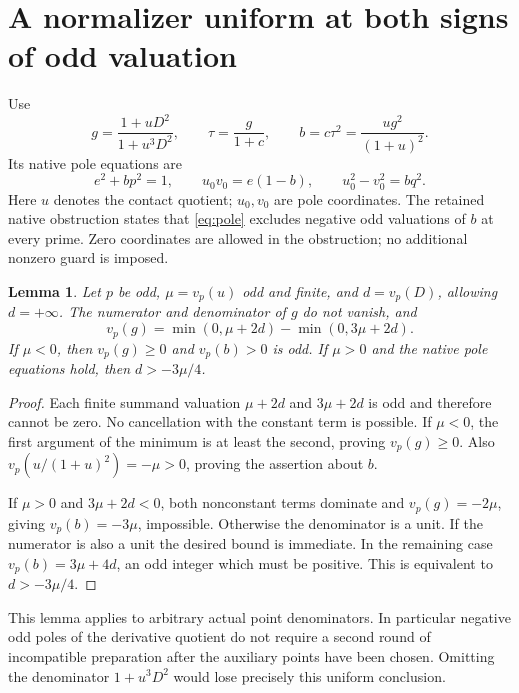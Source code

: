 \documentclass[11pt,a4paper]{article}
\newtheorem{lemma}[theorem]{Lemma}
\begin{document}
\section{A normalizer uniform at both signs of odd valuation}

Use
\begin{equation}\label{eq:normalizer}
 g=\frac{1+uD^2}{1+u^3D^2},\qquad
 \tau=\frac{g}{1+c},\qquad
 b=c\tau^2=\frac{u g^2}{(1+u)^2}.
\end{equation}
Its native pole equations are
\begin{equation}\label{eq:pole}
 e^2+bp^2=1,\qquad u_0v_0=e(1-b),\qquad u_0^2-v_0^2=bq^2.
\end{equation}
Here $u$ denotes the contact quotient; $u_0,v_0$ are pole coordinates.
The retained native obstruction states that \eqref{eq:pole} excludes
negative odd valuations of $b$ at every prime. Zero coordinates are
allowed in the obstruction; no additional nonzero guard is imposed.

\begin{lemma}\label{lem:normalizer}
Let $p$ be odd, $\mu=v_p(u)$ odd and finite, and $d=v_p(D)$, allowing
$d=+\infty$. The numerator and denominator of $g$ do not vanish, and
\[
 v_p(g)=\min(0,\mu+2d)-\min(0,3\mu+2d).
\]
If $\mu<0$, then $v_p(g)\ge0$ and $v_p(b)>0$ is odd. If $\mu>0$
and the native pole equations hold, then $d>-3\mu/4$.
\end{lemma}
\begin{proof}
Each finite summand valuation $\mu+2d$ and $3\mu+2d$ is odd and
therefore cannot be zero. No cancellation with the constant term is
possible. If $\mu<0$, the first argument of the minimum is at least
the second, proving $v_p(g)\ge0$. Also
$v_p(u/(1+u)^2)=-\mu>0$, proving the assertion about $b$.

If $\mu>0$ and $3\mu+2d<0$, both nonconstant terms dominate and
$v_p(g)=-2\mu$, giving $v_p(b)=-3\mu$, impossible. Otherwise the
denominator is a unit. If the numerator is also a unit the desired
bound is immediate. In the remaining case
$v_p(b)=3\mu+4d$, an odd integer which must be positive. This is
equivalent to $d>-3\mu/4$.
\end{proof}

This lemma applies to arbitrary actual point denominators. In particular
negative odd poles of the derivative quotient do not require a second
round of incompatible preparation after the auxiliary points have been
chosen. Omitting the denominator $1+u^3D^2$ would lose precisely this
uniform conclusion.
\end{document}
